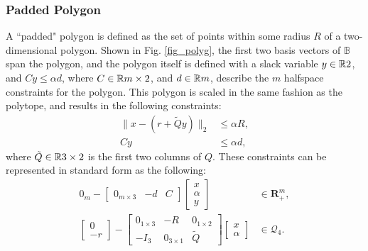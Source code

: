 \subsubsection{Padded Polygon}
A ``padded" polygon is defined as the set of points within some radius $R$ of a two-dimensional polygon. Shown in Fig. \ref{fig_polyg}, the first two basis vectors of $\mathbb{B}$ span the polygon, and the polygon itself is defined with a slack variable $y \in \mathbb{R}{2}$, and $Cy\leq \alpha d$, where $C \in \mathbb{R}{m \times 2}$, and $d \in \mathbb{R}{m}$, describe the $m$ halfspace constraints for the polygon. This polygon is scaled in the same fashion as the polytope, and results in the following constraints:
\begin{align}
    \| x - (r + \tilde{Q} y)\|_2 &\leq \alpha R, \\ 
    Cy &\leq \alpha d,
\end{align}
where $\tilde{Q} \in \mathbb{R}{3\times 2}$ is the first two columns of $Q$. These constraints can be represented in standard form as the following:
\begin{align}
    0_{m} - \begin{bmatrix} 0_{m \times 3} & -d & C  \end{bmatrix} \begin{bmatrix} x \\ \alpha \\ y\end{bmatrix} &\in \mathbf{R}_+^m, \\
   \begin{bmatrix} 0 \\ -r \end{bmatrix} - \begin{bmatrix} 0_{1 \times 3} & -R & 0_{1 \times 2} \\ -I_3 & 0_{3 \times 1} & \tilde{Q} \end{bmatrix} \begin{bmatrix} x \\ \alpha \end{bmatrix} &\in \mathcal{Q}_4.
\end{align}
